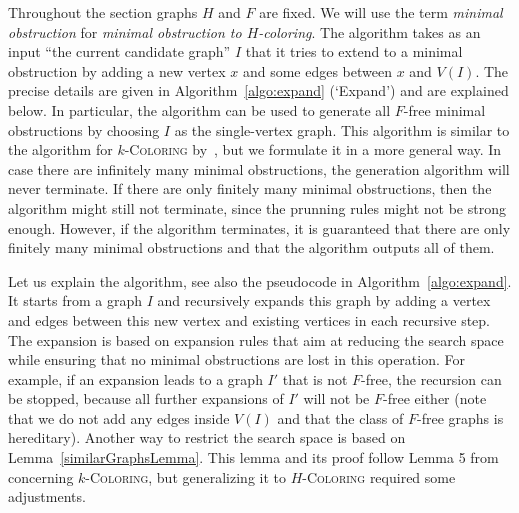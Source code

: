 \documentclass[11pt,a4paper]{article}
\theoremstyle{mystyle}
\newcommand{\colo}[1]{\ensuremath{#1}-\textsc{Coloring}\xspace}
\begin{document}
Throughout the section graphs $H$ and $F$ are fixed. We will use the term \emph{minimal obstruction} for \emph{minimal obstruction to $H$-coloring}.
The algorithm takes as an input ``the current candidate graph'' $I$ that it tries to extend to a minimal obstruction by adding a new vertex $x$ and some edges between $x$ and $V(I)$. The precise details are given in Algorithm~\ref{algo:expand} (\lq Expand\rq) and are explained below. In particular, the algorithm can be used to generate all $F$-free minimal obstructions by choosing $I$ as the single-vertex graph. This algorithm is similar to the algorithm for \colo{k} by~\cite{DBLP:journals/jgt/GoedgebeurS18}, but we formulate it in a more general way.
 In case there are infinitely many minimal obstructions, the generation algorithm will never terminate.
 If there are only finitely many minimal obstructions, then the algorithm might still not terminate, since the prunning rules might not be strong enough. 
 However, if the algorithm terminates, it is guaranteed that there are only finitely many minimal obstructions and that the algorithm outputs all of them.

Let us explain the algorithm, see also the pseudocode in Algorithm~\ref{algo:expand}.
It starts from a graph $I$ and recursively expands this graph by adding a vertex and edges between this new vertex and existing vertices in each recursive step.
The expansion is based on expansion rules that aim at reducing the search space while ensuring that no minimal obstructions are lost in this operation.
For example, if an expansion leads to a graph $I'$ that is not $F$-free, the recursion can be stopped, because all further expansions of $I'$ will not be $F$-free either (note that we do not add any edges inside $V(I)$ and that the class of $F$-free graphs is hereditary).
Another way to restrict the search space is based on Lemma~\ref{similarGraphsLemma}.
This lemma and its proof follow Lemma 5 from~\cite{DBLP:journals/jct/ChudnovskyGSZ20} concerning \colo{k}, but generalizing it to \colo{H} required some adjustments.
\end{document}
